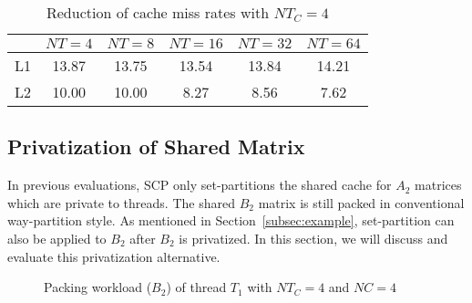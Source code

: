 \begin{table}
  \centering
  \caption{Reduction of cache miss rates with $NT_C=4$}
  \label{tab:papi}
  \setlength{\tabcolsep}{3.5pt}
  \begin{tabular}{lccccc}
    \toprule
     & $NT=4$ & $NT=8$ & $NT=16$ & $NT=32$ & $NT=64$ \\
    \midrule
    L1     & 13.87 & 13.75 & 13.54 & 13.84 & 14.21 \\
    L2     & 10.00 & 10.00 & 8.27 & 8.56 & 7.62 \\
    \bottomrule
  \end{tabular}
\end{table}

\subsection{Privatization of Shared Matrix}\label{subsec:privb}
In previous evaluations, SCP only set-partitions the shared cache
for $A_2$ matrices which are private to threads.
The shared $B_2$ matrix is still packed
in conventional way-partition style.
As mentioned in Section~\ref{subsec:example},
set-partition can also be applied to $B_2$ after $B_2$ is privatized.
In this section, we will discuss and evaluate this privatization alternative.

\begin{figure}
  \centering
  \caption{Packing workload ($B_2$) of thread $T_1$ with $NT_C=4$ and $NC=4$}
  \label{fig:packb}
\end{figure}

